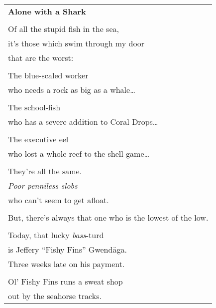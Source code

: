 \documentclass{article}
\begin{document}
\newcommand{\h}{\hspace*{2ex}}
\begin{center}
\begin{tabular}{l}
\textbf{Alone with a Shark} \\
\\
Of all the stupid fish in the sea, \\
\h{}it's those which swim through my door \\
that are the worst: \\
\\
\h{}The blue-scaled worker \\
\h\h{}who needs a rock as big as a whale\ldots \\
\\
\h{}The school-fish \\
\h\h{}who has a severe addition to Coral Drops\ldots \\
\\
\h{}The executive eel \\
\h\h{}who lost a whole reef to the shell game\ldots \\
\\
They're all the same. \\
\h{}\textit{Poor penniless slobs} \\
who can't seem to get afloat. \\
\\
But, there's always that one who is the lowest of the low. \\
\\                                          %
Today, that lucky \textit{bass}-turd \\
\h{}is Jeffery ``Fishy Fins'' Gwend{\"a}ga. \\
Three weeks late on his payment. \\
\\
Ol' Fishy Fins runs a sweat shop \\ %
out by the seahorse tracks. \\


\end{tabular}
\end{center}
\end{document}

